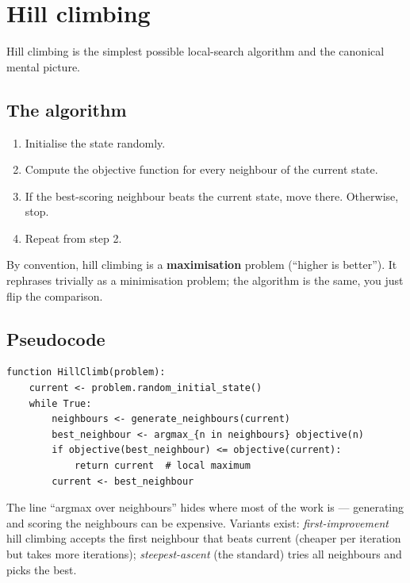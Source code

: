 \documentclass[11pt, a4paper]{article}
\begin{document}
\section{Hill climbing}

Hill climbing is the simplest possible local-search algorithm and the canonical mental picture.

\subsection{The algorithm}

\begin{defbox}
\begin{enumerate}
  \item Initialise the state randomly.
  \item Compute the objective function for every neighbour of the current state.
  \item If the best-scoring neighbour beats the current state, move there. Otherwise, stop.
  \item Repeat from step 2.
\end{enumerate}
By convention, hill climbing is a \textbf{maximisation} problem (``higher is better''). It rephrases trivially as a minimisation problem; the algorithm is the same, you just flip the comparison.
\end{defbox}

\subsection{Pseudocode}

\begin{exbox}
\begin{verbatim}
function HillClimb(problem):
    current <- problem.random_initial_state()
    while True:
        neighbours <- generate_neighbours(current)
        best_neighbour <- argmax_{n in neighbours} objective(n)
        if objective(best_neighbour) <= objective(current):
            return current  # local maximum
        current <- best_neighbour
\end{verbatim}
\end{exbox}

The line ``argmax over neighbours'' hides where most of the work is — generating and scoring the neighbours can be expensive. Variants exist: \emph{first-improvement} hill climbing accepts the first neighbour that beats current (cheaper per iteration but takes more iterations); \emph{steepest-ascent} (the standard) tries all neighbours and picks the best.
\end{document}
